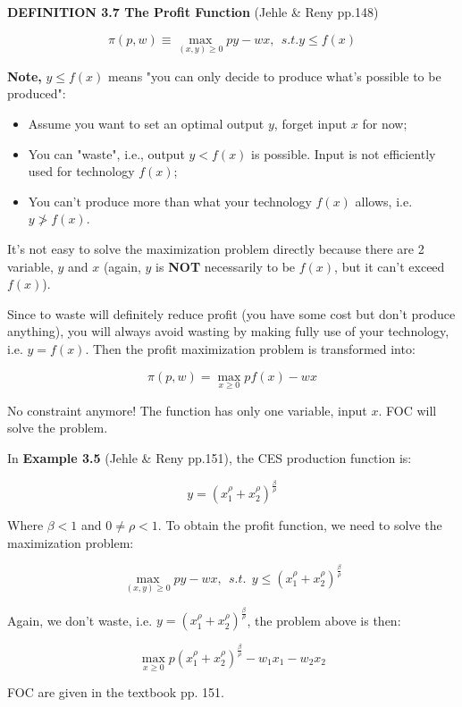 \documentclass{article}
\begin{document}
\begin{mdframed}[backgroundcolor=blue!20,linecolor=white]

\textbf{DEFINITION 3.7 The Profit Function} (Jehle \& Reny pp.148)

$$\pi (p,w) \equiv \max_{(x,y) \ge 0} py - wx, \ \ s.t. y \le f(x)$$

\textbf{Note,} $y \le f(x)$ means "you can only decide to produce what's possible to be produced":

\begin{itemize}
\item Assume you want to set an optimal output $y$, forget input $x$ for now;
\item You can "waste", i.e., output $y < f(x)$ is possible. Input is not efficiently used for technology $f(x)$;
\item You can't produce more than what your technology $f(x)$ allows, i.e.  $y \ngtr f(x)$.
\end{itemize}

It's not easy to solve the maximization problem directly because there are 2 variable, $y$ and $x$ (again, $y$ is \textbf{NOT} 
necessarily to be $f(x)$, but it can't exceed $f(x)$).

Since to waste will definitely reduce profit (you have some cost but don't produce anything), you will always avoid wasting by
making fully use of your technology, i.e. $y = f(x)$. Then the profit maximization problem is transformed into:

$$\pi (p,w) = \max_{x \ge 0} p f(x) - wx$$

No constraint anymore! The function has only one variable, input $x$. FOC will solve the problem.


In \textbf{Example 3.5} (Jehle \& Reny pp.151), the CES production function is:

$$y = (x_1^\rho + x_2^\rho)^{\frac{\beta}{\rho}}$$

Where $\beta < 1$ and $0 \ne \rho <1$. To obtain the profit function, we need to solve the maximization problem:


$$\max_{(x,y) \ge 0} py - wx, \ \ s.t. \ \ y \le (x_1^\rho + x_2^\rho)^{\frac{\beta}{\rho}}$$

Again, we don't waste, i.e. $ y = (x_1^\rho + x_2^\rho)^{\frac{\beta}{\rho}}$, the problem above is then:

$$\max_{x \ge 0} p(x_1^\rho + x_2^\rho)^{\frac{\beta}{\rho}} - w_1x_1 - w_2x_2$$

FOC are given in the textbook pp. 151. 


\end{mdframed}
\end{document}
